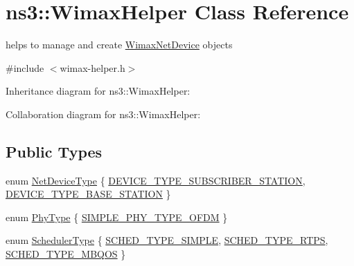 \hypertarget{classns3_1_1WimaxHelper}{}\section{ns3\+:\+:Wimax\+Helper Class Reference}
\label{classns3_1_1WimaxHelper}


helps to manage and create \hyperlink{classns3_1_1WimaxNetDevice}{Wimax\+Net\+Device} objects  




{\ttfamily \#include $<$wimax-\/helper.\+h$>$}



Inheritance diagram for ns3\+:\+:Wimax\+Helper\+:


Collaboration diagram for ns3\+:\+:Wimax\+Helper\+:
\subsection*{Public Types}
\begin{DoxyCompactItemize}
\item 
enum \hyperlink{classns3_1_1WimaxHelper_a2c8fd9211cf4d7605e506b7c983d78fc}{Net\+Device\+Type} \{ \hyperlink{classns3_1_1WimaxHelper_a2c8fd9211cf4d7605e506b7c983d78fca395fa658c1ce6f03083981f3d219cd7a}{D\+E\+V\+I\+C\+E\+\_\+\+T\+Y\+P\+E\+\_\+\+S\+U\+B\+S\+C\+R\+I\+B\+E\+R\+\_\+\+S\+T\+A\+T\+I\+ON}, 
\hyperlink{classns3_1_1WimaxHelper_a2c8fd9211cf4d7605e506b7c983d78fca96e5d9ff34a8a0da1262f37e83abc43b}{D\+E\+V\+I\+C\+E\+\_\+\+T\+Y\+P\+E\+\_\+\+B\+A\+S\+E\+\_\+\+S\+T\+A\+T\+I\+ON}
 \}
\item 
enum \hyperlink{classns3_1_1WimaxHelper_a42439a8e9f959fd3f5bdf698d248f71a}{Phy\+Type} \{ \hyperlink{classns3_1_1WimaxHelper_a42439a8e9f959fd3f5bdf698d248f71aa6884df5358e269f2339f63203851ccb7}{S\+I\+M\+P\+L\+E\+\_\+\+P\+H\+Y\+\_\+\+T\+Y\+P\+E\+\_\+\+O\+F\+DM}
 \}
\item 
enum \hyperlink{classns3_1_1WimaxHelper_a27a40a8f601900126156781c2ca79406}{Scheduler\+Type} \{ \hyperlink{classns3_1_1WimaxHelper_a27a40a8f601900126156781c2ca79406afd3166736b35190178c45686575fa65b}{S\+C\+H\+E\+D\+\_\+\+T\+Y\+P\+E\+\_\+\+S\+I\+M\+P\+LE}, 
\hyperlink{classns3_1_1WimaxHelper_a27a40a8f601900126156781c2ca79406ac3c001b603746dc6b65b27b99419a315}{S\+C\+H\+E\+D\+\_\+\+T\+Y\+P\+E\+\_\+\+R\+T\+PS}, 
\hyperlink{classns3_1_1WimaxHelper_a27a40a8f601900126156781c2ca79406ade891904742c17bf21ef7f6e5d1c7ddc}{S\+C\+H\+E\+D\+\_\+\+T\+Y\+P\+E\+\_\+\+M\+B\+Q\+OS}
 \}
\end{DoxyCompactItemize}
